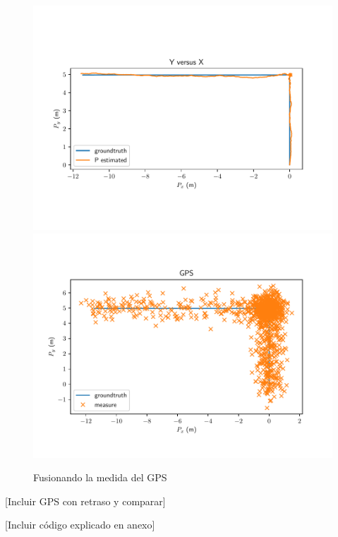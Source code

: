 \begin{figure}
\includegraphics[width=\textwidth]{estimador_px4/im_simu/tray}
\includegraphics[width=\textwidth]{estimador_px4/im_simu/gps}
\caption{Fusionando la medida del GPS}
\label{fig:simu2}
\end{figure}


{\color{red} [Incluir GPS con retraso y comparar]}


{\color{red} [Incluir código explicado en anexo]}


\endinput
